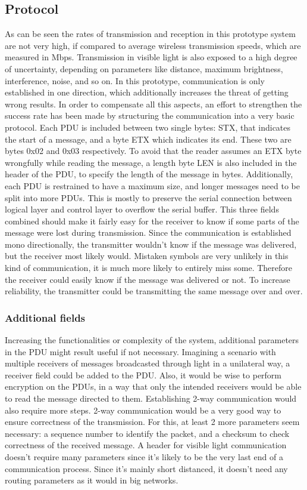 \subsection{Protocol}
As can be seen the rates of transmission and reception in this prototype system are not very high, if compared to average wireless transmission speeds, which are measured in Mbps.
Transmission in visible light is also exposed to a high degree of uncertainty, depending on parameters like distance, maximum brightness, interference, noise, and so on.
In this prototype, communication is only established in one direction, which additionally increases the threat of getting wrong results.
In order to compensate all this aspects, an effort to strengthen the success rate has been made by structuring the communication into a very basic protocol.
Each PDU is included between two single bytes: STX, that indicates the start of a message, and a byte ETX which indicates its end. These two are bytes 0x02 and 0x03 respectively. To avoid that the reader assumes an ETX byte wrongfully while reading the message, a length byte LEN is also included in the header of the PDU, to specify the length of the message in bytes.
Additionally, each PDU is restrained to have a maximum size, and longer messages need to be split into more PDUs.
This is mostly to preserve the serial connection between logical layer and control layer to overflow the serial buffer.
This three fields combined should make it fairly easy for the receiver to know if some parts of the message were lost during transmission.
Since the communication is established mono directionally, the transmitter wouldn't know if the message was delivered, but the receiver most likely would.
Mistaken symbols are very unlikely in this kind of communication, it is much more likely to entirely miss some.
Therefore the receiver could easily know if the message was delivered or not.
To increase reliability, the transmitter could be transmitting the same message over and over.

\subsubsection{Additional fields}
Increasing the functionalities or complexity of the system, additional parameters in the PDU might result useful if not necessary. 
Imagining a scenario with multiple receivers of messages broadcasted through light in a unilateral way, a receiver field could be added to the PDU. Also, it would be wise to perform encryption on the PDUs, in a way that only the intended receivers would be able to read the message directed to them.
Establishing 2-way communication would also require more steps. 2-way communication would be a very good way to ensure correctness of the transmission. For this, at least 2 more parameters seem necessary: a sequence number to identify the packet, and a checksum to check correctness of the received message.
A header for visible light communication doesn't require many parameters since it's likely to be the very last end of a communication process. Since it's mainly short distanced, it doesn't need any routing parameters as it would in big networks. 

